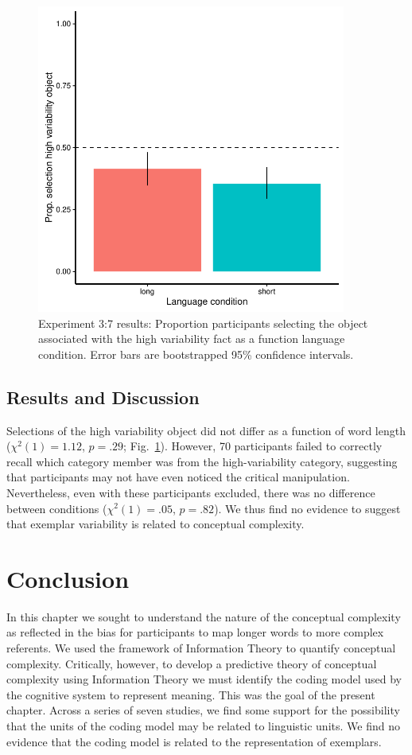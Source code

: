   \begin{figure}[t!]
 \begin{center}
  \includegraphics[width=4in]{figs/var_results.pdf}
  \caption{\label{fig:var_plot} Experiment 3:7 results: Proportion participants selecting the object associated with the high variability fact as a function language condition.  Error bars are bootstrapped 95\% confidence intervals.}
 \end{center}
\end{figure}


\subsection{Results and Discussion}

Selections of the high variability object did not differ as a function of word length (${\chi}^2$$(1) = 1.12$, $p = .29$; Fig.\ \ref{fig:var_plot}). However, 70 participants failed to correctly recall which category member was from the high-variability category, suggesting that participants may not have even noticed the critical manipulation. Nevertheless, even with these participants excluded, there was no difference between conditions (${\chi}^2$$(1) = .05$, $p = .82$). We thus find no evidence to suggest that exemplar variability is related to conceptual complexity.



\section{Conclusion}
In this chapter we sought to understand the nature of the conceptual complexity as reflected in the bias for participants to map longer words to more complex  referents. We used the framework of  Information Theory to quantify conceptual complexity. Critically, however, to develop a predictive theory of conceptual complexity using Information Theory we must identify the  coding model used by the cognitive system to represent meaning. This was the goal of the present chapter.  Across a series of seven studies, we find some support for the possibility that the units of the coding model may be related to linguistic units. We find no evidence that the coding model is related to the representation of exemplars. 


